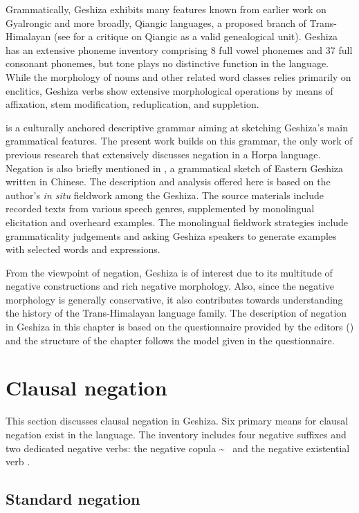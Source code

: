 \documentclass[output=paper,colorlinks,citecolor=brown]{langscibook}
\begin{document}
Grammatically, Geshiza exhibits many features known from earlier work on Gyalrongic and more broadly, Qiangic languages, a proposed branch of Trans-Himalayan (see  \citealt{Chirkova2012} for a critique on Qiangic as a valid genealogical unit). Geshiza has an extensive phoneme inventory comprising 8 full vowel phonemes and 37 full consonant phonemes, but tone plays no distinctive function in the language. While the morphology of nouns and other related word classes relies primarily on enclitics, Geshiza verbs show extensive morphological operations by means of affixation, stem modification, reduplication, and suppletion. 

\citet{Honkasalo2019} is a culturally anchored descriptive grammar aiming at sketching Geshiza's main grammatical features. The present work builds on this grammar, the only work of previous research that extensively discusses negation in a Horpa language. Negation is also briefly mentioned in \citet{Duoerji1998}, a grammatical sketch of Eastern Geshiza written in Chinese.
The description and analysis offered here is based on the author's \textit{in situ} fieldwork among the Geshiza. The source materials include recorded texts from various speech genres, supplemented by monolingual elicitation and overheard examples. The monolingual fieldwork strategies include grammaticality judgements and asking Geshiza speakers to generate examples with selected words and expressions.

From the viewpoint of negation, Geshiza is of interest due to its multitude of negative constructions and rich negative morphology. Also, since the negative morphology is generally conservative, it also contributes towards understanding the history of the Trans-Himalayan language family. The description of negation in Geshiza in this chapter is based on the questionnaire provided by the editors () and the structure of the chapter follows the model given in the questionnaire.

\section{Clausal negation} 
This section discusses clausal negation in Geshiza. Six primary means for clausal negation exist in the language. The inventory includes four negative suffixes and two dedicated negative verbs: the negative copula  \textasciitilde \  and the negative existential verb . 

\subsection{Standard negation}
\end{document}
